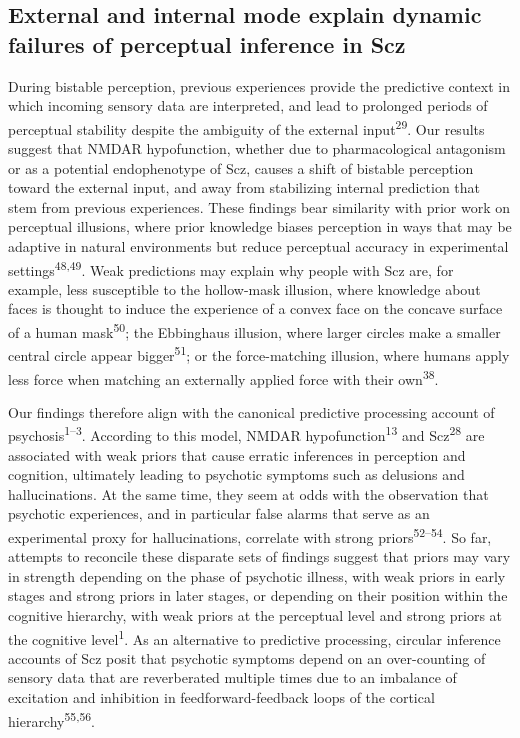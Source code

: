 \documentclass[
]{article}
\begin{document}
\subsection{External and internal mode explain dynamic failures of
perceptual inference in
Scz}\label{external-and-internal-mode-explain-dynamic-failures-of-perceptual-inference-in-scz}

During bistable perception, previous experiences provide the predictive
context in which incoming sensory data are interpreted, and lead to
prolonged periods of perceptual stability despite the ambiguity of the
external input\textsuperscript{29}. Our results suggest that NMDAR
hypofunction, whether due to pharmacological antagonism or as a
potential endophenotype of Scz, causes a shift of bistable perception
toward the external input, and away from stabilizing internal prediction
that stem from previous experiences. These findings bear similarity with
prior work on perceptual illusions, where prior knowledge biases
perception in ways that may be adaptive in natural environments but
reduce perceptual accuracy in experimental
settings\textsuperscript{48,49}. Weak predictions may explain why people
with Scz are, for example, less susceptible to the hollow-mask illusion,
where knowledge about faces is thought to induce the experience of a
convex face on the concave surface of a human mask\textsuperscript{50};
the Ebbinghaus illusion, where larger circles make a smaller central
circle appear bigger\textsuperscript{51}; or the force-matching
illusion, where humans apply less force when matching an externally
applied force with their own\textsuperscript{38}.

Our findings therefore align with the canonical predictive processing
account of psychosis\textsuperscript{1--3}. According to this model,
NMDAR hypofunction\textsuperscript{13} and Scz\textsuperscript{28} are
associated with weak priors that cause erratic inferences in perception
and cognition, ultimately leading to psychotic symptoms such as
delusions and hallucinations. At the same time, they seem at odds with
the observation that psychotic experiences, and in particular false
alarms that serve as an experimental proxy for hallucinations, correlate
with strong priors\textsuperscript{52--54}. So far, attempts to
reconcile these disparate sets of findings suggest that priors may vary
in strength depending on the phase of psychotic illness, with weak
priors in early stages and strong priors in later stages, or depending
on their position within the cognitive hierarchy, with weak priors at
the perceptual level and strong priors at the cognitive
level\textsuperscript{1}. As an alternative to predictive processing,
circular inference accounts of Scz posit that psychotic symptoms depend
on an over-counting of sensory data that are reverberated multiple times
due to an imbalance of excitation and inhibition in feedforward-feedback
loops of the cortical hierarchy\textsuperscript{55,56}.
\end{document}
